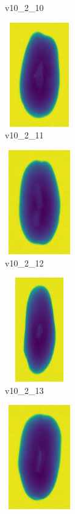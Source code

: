 \documentclass[11pt]{article}
\begin{document}
\begin{figure}
\begin{subfigure}[b]{0.15\textwidth}
        \caption{v10\_2\_10}
         \label{fig:three sin x}
     \end{subfigure}
     \hfill
     \begin{subfigure}[b]{0.15\textwidth}
         \centering
         \includegraphics[width=3cm, height=4.5cm]{images/kartofler/v10_2_7_cut.png}
        \caption{v10\_2\_11}
         \label{fig:five over x}
     \end{subfigure}
     \hfill
    \begin{subfigure}[b]{0.15\textwidth}
         \centering
         \includegraphics[width=3cm, height=4.5cm]{images/kartofler/v10_2_8_cut.png}
        \caption{v10\_2\_12}
         \label{fig:five over x}
     \end{subfigure}
     \hfill
    \begin{subfigure}[b]{0.15\textwidth}
         \centering
         \includegraphics[width=3cm, height=4.5cm]{images/kartofler/v10_2_9_cut.png}
        \caption{v10\_2\_13}
         \label{fig:five over x}
     \end{subfigure} 
     \hfill
    \begin{subfigure}[b]{0.15\textwidth}
         \centering
         \includegraphics[width=3cm, height=4.5cm]{images/kartofler/v10_2_10_cut.png}

\end{subfigure}
\end{figure}
\end{document}
